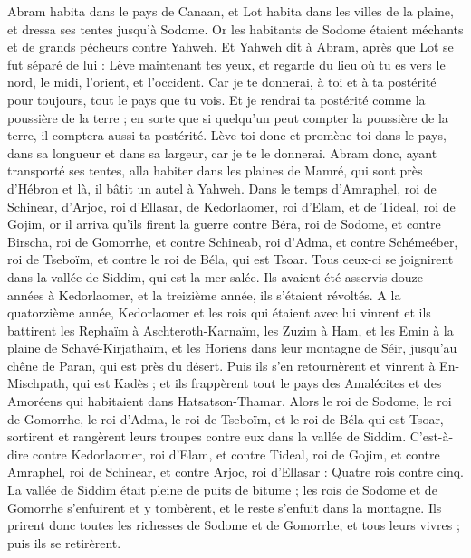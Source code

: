 \begin{multicols}{2}
Abram habita dans le pays de Canaan, et Lot habita dans les villes de la plaine, et dressa ses tentes jusqu'à Sodome.
Or les habitants de Sodome étaient méchants et de grands pécheurs contre Yahweh.
Et Yahweh dit à Abram, après que Lot se fut séparé de lui : Lève maintenant tes yeux, et regarde du lieu où tu es vers le nord, le midi, l'orient, et l'occident.
Car je te donnerai, à toi et à ta postérité pour toujours, tout le pays que tu vois.
Et je rendrai ta postérité comme la poussière de la terre ; en sorte que si quelqu'un peut compter la poussière de la terre, il comptera aussi ta postérité.
Lève-toi donc et promène-toi dans le pays, dans sa longueur et dans sa largeur, car je te le donnerai.
Abram donc, ayant transporté ses tentes, alla habiter dans les plaines de Mamré, qui sont près d'Hébron et là, il bâtit un autel à Yahweh.
\VerseOne{}Dans le temps d'Amraphel, roi de Schinear, d'Arjoc, roi d'Ellasar, de Kedorlaomer, roi d'Elam, et de Tideal, roi de Gojim,
or il arriva qu'ils firent la guerre contre Béra, roi de Sodome, et contre Birscha, roi de Gomorrhe, et contre Schineab, roi d'Adma, et contre Schémeéber, roi de Tseboïm, et contre le roi de Béla, qui est Tsoar.
Tous ceux-ci se joignirent dans la vallée de Siddim, qui est la mer salée.
Ils avaient été asservis douze années à Kedorlaomer, et la treizième année, ils s'étaient révoltés.
A la quatorzième année, Kedorlaomer et les rois qui étaient avec lui vinrent et ils battirent les Rephaïm à Aschteroth-Karnaïm, les Zuzim à Ham, et les Emin à la plaine de Schavé-Kirjathaïm,
et les Horiens dans leur montagne de Séir, jusqu'au chêne de Paran, qui est près du désert.
Puis ils s'en retournèrent et vinrent à En-Mischpath, qui est Kadès ; et ils frappèrent tout le pays des Amalécites et des Amoréens qui habitaient dans Hatsatson-Thamar.
Alors le roi de Sodome, le roi de Gomorrhe, le roi d'Adma, le roi de Tseboïm, et le roi de Béla qui est Tsoar, sortirent et rangèrent leurs troupes contre eux dans la vallée de Siddim.
C'est-à-dire contre Kedorlaomer, roi d'Elam, et contre Tideal, roi de Gojim, et contre Amraphel, roi de Schinear, et contre Arjoc, roi d'Ellasar : Quatre rois contre cinq.
La vallée de Siddim était pleine de puits de bitume ; les rois de Sodome et de Gomorrhe s'enfuirent et y tombèrent, et le reste s'enfuit dans la montagne.
Ils prirent donc toutes les richesses de Sodome et de Gomorrhe, et tous leurs vivres ; puis ils se retirèrent.

\end{multicols}

